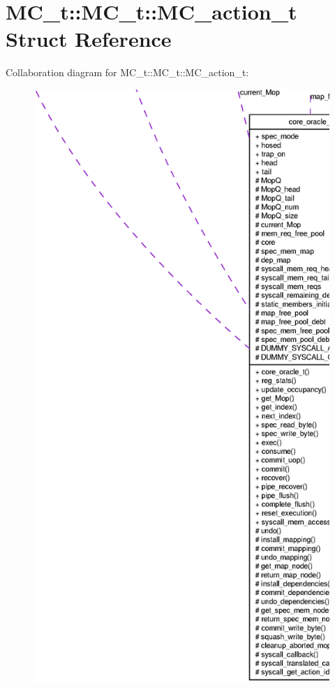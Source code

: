 \section{MC\_\-t::MC\_\-t::MC\_\-action\_\-t Struct Reference}
\label{structMC__t_1_1MC__action__t}
Collaboration diagram for MC\_\-t::MC\_\-t::MC\_\-action\_\-t:\nopagebreak
\begin{figure}[H]
\begin{center}
\leavevmode
\includegraphics[width=400pt]{structMC__t_1_1MC__action__t__coll__graph}
\end{center}
\end{figure}

